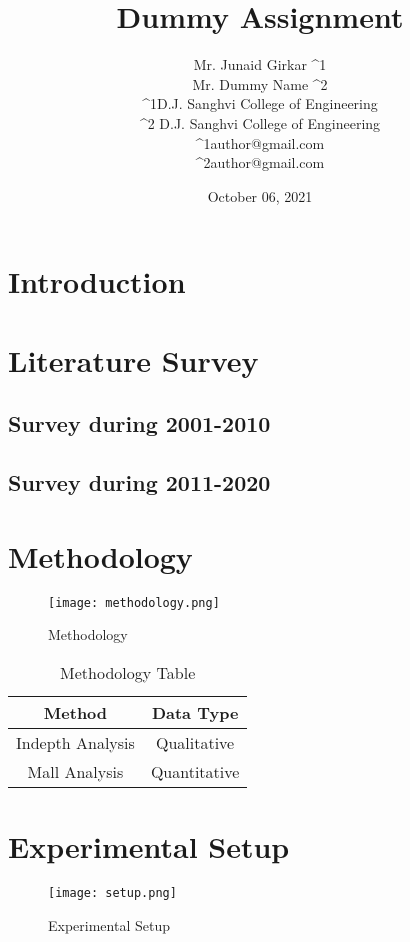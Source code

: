 \documentclass[20,twocolumn]{article}
\title{Dummy Assignment}
\author{Mr. Junaid Girkar ^1 \\ Mr. Dummy Name ^2\\
^1D.J. Sanghvi College of Engineering \\ ^2 D.J. Sanghvi College of Engineering\\
^1author@gmail.com\\ ^2author@gmail.com}
\date{October 06, 2021}
\begin{document}
\maketitle
\section{Introduction}
\lipsum[1]

\section{Literature Survey}
\subsection{Survey during 2001-2010}
\lipsum[2]

\subsection{Survey during 2011-2020}
\lipsum[3]

\section{Methodology}
\lipsum[4]
\begin{figure}[h]
    \centering
    \texttt{[image: methodology.png]}
    \caption{Methodology}
    \label{img1}
\end{figure}

\begin{table}[h]
    \centering
    \begin{tabular}{|c|c|}
         \hline
         Method & Data Type \\
         \hline
         Indepth Analysis & Qualitative\\
         \hline
         Mall Analysis & Quantitative\\
         \hline
    \end{tabular}
    \caption{Methodology Table}
    \label{tab1}
\end{table}


\section{Experimental Setup}
\lipsum[3]
\begin{figure}[h]
    \centering
    \texttt{[image: setup.png]}
    \caption{Experimental Setup}
    \label{img2}
\end{figure}
\end{document}
